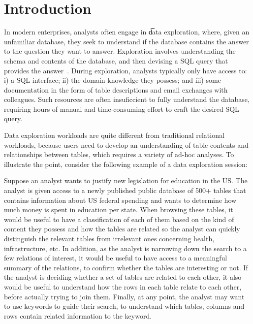 
\newcommand{\specialcell}[2][c]{%
  \begin{tabular}[#1]{@{}c@{}}#2\end{tabular}}

\section*{Introduction}
\label{introduction}

In modern enterprises, analysts often engage in {\t data exploration}, where,
given an unfamiliar database, they seek to understand if the database contains
the answer to the question they want to answer. Exploration involves
understanding the schema and contents of the database, and then devising a SQL
query that provides the answer~\cite{dataexploration}.  During exploration,
analysts typically only have access to: i) a SQL interface; ii)
the domain knowledge they possess; and iii) some documentation in the form of
table descriptions and email exchanges with colleagues. Such resources are often
insuficcient to fully understand the database, requiring hours of manual and
time-consuming effort to craft the desired SQL query.

Data exploration workloads are quite different from traditional relational
workloads, because users need to develop an understanding of table contents
and relationships between tables, which requires a variety of ad-hoc analyses.
To illustrate the point, consider the following example of a data exploration
session:

Suppose an analyst wants to justify new legislation for education in the US.
The analyst is given access to a newly published public database of 500+ tables
that contains information about US federal spending and wants to determine how
much money is spent in education per state. When browsing these tables, it would
be useful to have a classification of each of them based on the kind of content
they possess and how the tables are related so the analyst can quickly
distinguish the relevant tables from irrelevant ones concerning health,
infrastructure, etc. In addition, as the analyst is narrowing down the search to
a few relations of interest, it would be useful to have access to a meaningful
summary of the relations, to confirm whether the tables are interesting or not.
If the analyst is deciding whether a set of tables are related to each other, it
also would be useful to understand how the rows in each table relate to each
other, before actually trying to join them. Finally, at any point, the analyst
may want to use keywords to guide their search, to understand which tables,
columns and rows contain related information to the keyword.


